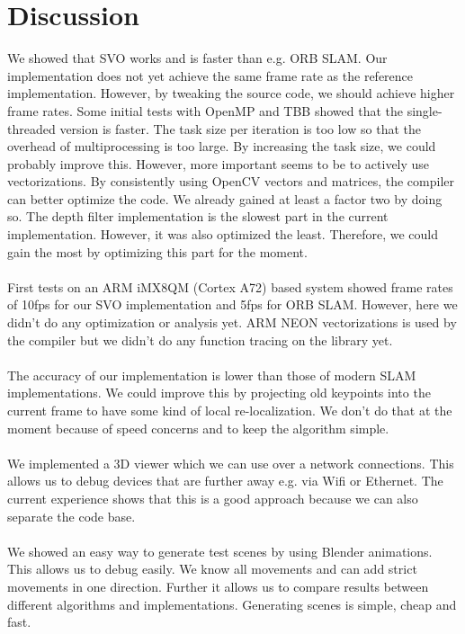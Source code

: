 \documentclass[11pt,a4paper,titlepage,oneside]{report}
\begin{document}
\chapter{Discussion}\label{ch:discussion}

We showed that SVO works and is faster than e.g. ORB SLAM. Our implementation does not yet achieve the same frame rate as the reference implementation. However, by tweaking the source code, we should achieve higher frame rates. Some initial tests with OpenMP and TBB showed that the single-threaded version is faster. The task size per iteration is too low so that the overhead of multiprocessing is too large. By increasing the task size, we could probably improve this. However, more important seems to be to actively use vectorizations. By consistently using OpenCV vectors and matrices, the compiler can better optimize the code. We already gained at least a factor two by doing so. The depth filter implementation is the slowest part in the current implementation. However, it was also optimized the least. Therefore, we could gain the most by optimizing this part for the moment.\\\\
First tests on an ARM iMX8QM (Cortex A72) based system showed frame rates of 10fps for our SVO implementation and 5fps for ORB SLAM. However, here we didn't do any optimization or analysis yet. ARM NEON vectorizations is used by the compiler but we didn't do any function tracing on the library yet.\\\\
The accuracy of our implementation is lower than those of modern SLAM implementations. We could improve this by projecting old keypoints into the current frame to have some kind of local re-localization. We don't do that at the moment because of speed concerns and to keep the algorithm simple.\\\\
We implemented a 3D viewer which we can use over a network connections. This allows us to debug devices that are further away e.g. via Wifi or Ethernet. The current experience shows that this is a good approach because we can also separate the code base.\\\\
We showed an easy way to generate test scenes by using Blender animations. This allows us to debug easily. We know all movements and can add strict movements in one direction. Further it allows us to compare results between different algorithms and implementations. Generating scenes is simple, cheap and fast.\\\\
\end{document}
